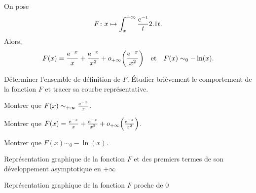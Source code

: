 
\begin{prop}
On pose
\[
\fonctionligne[F]{x}{\int_x^{+\infty} \frac{\e^{-t}}{t} \d t}.
\]
Alors,
\[
F(x) = \frac{\e^{-x}}{x} + \frac{\e^{-x}}{x^2} + o_{+\infty}\mathopen{}\bigg(\frac{\e^{-x}}{x^2}\bigg)
\quad \text{et} \quad
F(x) \sim_0 -\ln(x).
\]
\end{prop}

\begin{exercice}
\begin{questions}
\item Déterminer l'ensemble de définition de $F$. Étudier brièvement le comportement de la fonction $F$ et tracer sa courbe représentative.

\item Montrer que $F(x) \sim_{+\infty} \frac{\e^{-x}}{x}$.

\item Montrer que $F(x) = \frac{\e^{-x}}{x} + \frac{\e^{-x}}{x^2} + o_{+\infty}\mathopen{}\left(\frac{\e^{-x}}{x^2}\right)$.
       
\item Montrer que $F(x) \sim_0 -\ln(x)$.
\end{questions}
\end{exercice}

\begin{marginfigure}[-8cm]
    \centering
    
    \caption{Représentation graphique de la fonction $F$ et des premiers termes de son développement asymptotique en $+\infty$}
\end{marginfigure}
\begin{marginfigure}[-1cm]
    \centering
    
    \caption{Représentation graphique de la fonction $F$ proche de $0$}
\end{marginfigure}

